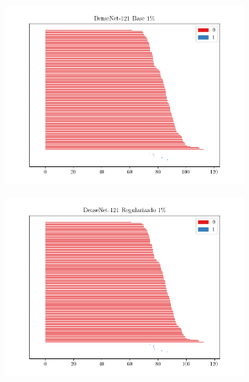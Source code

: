 \begin{figure}[H]
	\centering
	\begin{subfigure}
		{.5\textwidth}
		\centering
		\includegraphics[width=\linewidth]{img/bar_densenet_trans_base_0.01.png}
	\end{subfigure}%
	\begin{subfigure}
		{.5\textwidth}
		\centering
		\includegraphics[width=\linewidth]{img/bar_densenet_trans_reg_0.01.png}
	\end{subfigure}
	\begin{subfigure}
		{.5\textwidth}
		\centering

\end{subfigure}
\end{figure}
